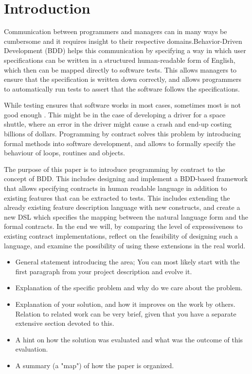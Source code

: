 \section{Introduction} %

Communication between programmers and managers can in many ways be cumbersome and it requires insight to their respective domains.Behavior-Driven Development (BDD) \cite{hellesoy2012} helps this communication by specifying a way in which user specifications can be written in a structured human-readable form of English, which then can be mapped directly to software tests. This allows managers to ensure that the specification is written down correctly, and allows programmers to automatically run tests to assert that the software follows the specifications. 

While testing ensures that software works in most cases, sometimes most is not good enough . This might be in the case of developing a driver for a space shuttle, where an error in the driver might cause a crash and end-up costing billions of dollars.  Programming by contract solves this problem by introducing formal methods into software development, and allows to formally specify the behaviour of loops, routines and objects. 

The purpose of this paper is to introduce programming by contract to the concept of BDD. This includes designing and implement a BDD-based framework that allows specifying contracts in human readable language in addition to existing features that can be extracted to tests. This includes extending the already existing feature description language with new constructs, and create a new DSL which specifies the mapping between the natural language form and the formal contracts. In the end we will, by comparing the level of expressiveness to existing contract implementations, reflect on the feasibility of designing such a language, and examine the possibility of using these extensions in the real world. 


\begin{itemize}
\item General statement introducing the area; You can most likely start with the first paragraph from your project description and evolve it.
\item Explanation of the specific problem and why do we care about the problem.
\item Explanation of your solution, and how it improves on the work by others. Relation to related work can be very brief, given that you have a separate extensive section devoted to this.
\item A hint on how the solution was evaluated and what was the outcome of this evaluation.
\item A summary (a "map") of how the paper is organized.
\end{itemize}